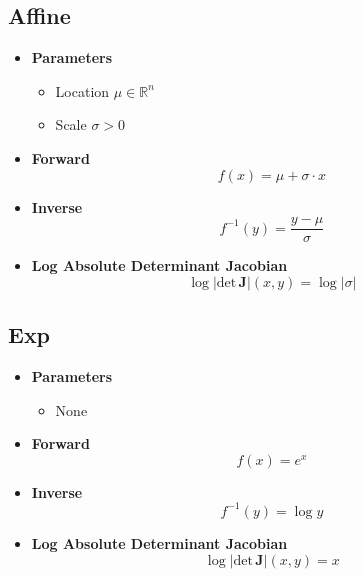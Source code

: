 \documentclass{article}
\begin{document}
\subsection{Affine}
\begin{itemize}
  \item \textbf{Parameters}
  \begin{itemize}
    \item Location $\mu \in \mathbb{R}^n$
    \item Scale $\sigma > 0$
  \end{itemize}
  \item \textbf{Forward}
  \begin{equation}
    f(x) = \mu + \sigma \cdot x
  \end{equation}
  \item \textbf{Inverse}
  \begin{equation}
    f^{-1}(y) = \frac{y - \mu}{\sigma}
  \end{equation}
  \item \textbf{Log Absolute Determinant Jacobian}
  \begin{equation}
    \log \vert \text{det} \, \mathbf{J} \vert (x, y) = \log \vert \sigma \vert
  \end{equation}
\end{itemize}
\subsection{Exp}
\begin{itemize}
  \item \textbf{Parameters}
  \begin{itemize}
    \item None
  \end{itemize}
  \item \textbf{Forward}
  \begin{equation}
    f(x) = e^x
  \end{equation}
  \item \textbf{Inverse}
  \begin{equation}
    f^{-1}(y) = \log y
  \end{equation}
  \item \textbf{Log Absolute Determinant Jacobian}
  \begin{equation}
    \log \vert \text{det} \, \mathbf{J} \vert (x, y) = x
  \end{equation}
\end{itemize}
\end{document}
